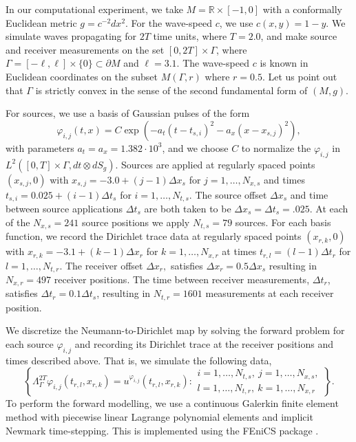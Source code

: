 \documentclass[final,leqno]{siamart1116}
\begin{document}
In our computational experiment, we take $M = {\mathbb{R}} \times [-1,0]$ with a
conformally Euclidean metric $g = c^{-2}dx^2$. For the wave-speed $c$,
we use $c(x,y) = 1-y$. We simulate waves propagating for $2T$ time
units, where $T = 2.0$, and make source and receiver measurements on
the set $[0,2T] \times \Gamma$, where $\Gamma = [-\ell,\ell] \times
\{0\} \subset {\partial} M$ and $\ell = 3.1$.  The wave-speed $c$ is known in
Euclidean coordinates on the subset $M(\Gamma,r)$ where $r = 0.5$. Let
us point out that $\Gamma$ is strictly convex in the sense of the
second fundamental form of $(M,g)$.

For sources, we use a basis of Gaussian pulses of the form
\begin{equation*}
  \varphi_{i,j}(t,x) = C \exp\left(-a_t (t-t_{s,i})^2 -a_x
  (x-x_{s,j})^2\right),
\end{equation*}
with parameters $a_t = a_x = 1.382 \cdot 10^3$, and we choose $C$ to
normalize the $\varphi_{i,j}$ in $L^2([0,T]\times \Gamma, {dt\otimes{dS_g}})$.
Sources are applied at regularly spaced points $(x_{s,j}, 0)$ with
$x_{s,j} = -3.0 + (j-1)\Delta x_s$ for $j = 1,\ldots,N_{x,s}$ and
times $t_{s,i} = 0.025 + (i-1) \Delta t_s$ for $i=1,\ldots,N_{t,s}$.
The source offset $\Delta x_s$ and time between source applications
$\Delta t_s$ are both taken to be $\Delta x_s = \Delta t_s = .025$. At
each of the $N_{x,s} = 241$ source positions we apply $N_{t,s} = 79$
sources. For each basis function, we record the Dirichlet trace data
at regularly spaced points $(x_{r,k},0)$ with $x_{r,k} = -3.1 +
(k-1)\Delta x_r$ for $k = 1,\ldots,N_{x,r}$ at times $t_{r,l} = (l-1)
\Delta t_r$ for $l=1,\ldots,N_{t,r}$.  The receiver offset $\Delta
x_r,$ satisfies $\Delta x_r = 0.5 \Delta x_s$ resulting in $N_{x,r} =
497$ receiver positions.  The time between receiver measurements,
$\Delta t_r$, satisfies $\Delta t_r = 0.1 \Delta t_s$, resulting in
$N_{t,r} = 1601$ measurements at each receiver position.

We discretize the Neumann-to-Dirichlet map by solving the forward
problem for each source $\varphi_{i,j}$ and recording its Dirichlet
trace at the receiver positions and times described above. That is, we
simulate the following data,
\begin{equation}
  \label{eqn:DiscreteNtD}
  \left\{ \Lambda_\Gamma^{2T}\varphi_{i,j}(t_{r,l},x_{r,k}) =
  u^{\varphi_{i,j}}(t_{r,l},x_{r,k}) :
  \begin{array}{l}
    i=1,\ldots,N_{t,s}, ~j = 1,\ldots,N_{x,s},\\ l=1,\ldots,N_{t,r},
    ~k = 1,\ldots,N_{x,r}
  \end{array}
  \right\}.
\end{equation}
To perform the forward modelling, we use a continuous Galerkin finite
element method with piecewise linear Lagrange polynomial elements and
implicit Newmark time-stepping. This is implemented using the FEniCS
package \cite{LoggMardalEtAl2012a}.  
\end{document}
